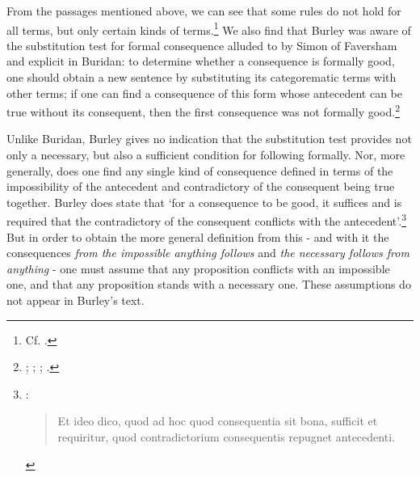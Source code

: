 \documentclass[]{birkjour}
\begin{document}
From the passages mentioned above, we can see that some rules do not hold for all terms, but only certain kinds of terms.\footnote{Cf. \autocite[p. 214.14-21]{BurleyDPAL}.} We also find that Burley was aware of the substitution test for formal consequence alluded to by Simon of Faversham and explicit in Buridan: to determine whether a consequence is formally good, one should obtain a new sentence by substituting its categorematic terms with other terms; if one can find a consequence of this form whose antecedent can be true without its consequent, then the first consequence was not formally good.\footnote{\autocite[pp. 162-163, par. 168]{Green-Pedersen1980b}; \autocite[p. 150.32-35]{BurleyDPAL}; \autocite[qq. 36-37]{FavershamQE}; \autocite[I. 4]{BuridanTC}.} 

Unlike Buridan, Burley gives no indication that the substitution test provides not only a necessary, but also a sufficient condition for following formally. Nor, more generally, does one find any single kind of consequence defined in terms of the impossibility of the antecedent and contradictory of the consequent being true together. Burley does state that `for a consequence to be good, it suffices and is required that the contradictory of the consequent conflicts with the antecedent'.\footnote{\autocite[p. 64.12-14]{BurleyDPAL}: \begin{quote}
		Et ideo dico, quod ad hoc quod consequentia sit bona, sufficit et requiritur, quod contradictorium consequentis repugnet antecedenti.
	\end{quote}} But in order to obtain the more general definition from this - and with it the consequences \textit{from the impossible anything follows} and \textit{the necessary follows from anything} - one must assume that any proposition conflicts with an impossible one, and that any proposition stands with a necessary one. These assumptions do not appear in Burley's text.
\end{document}
